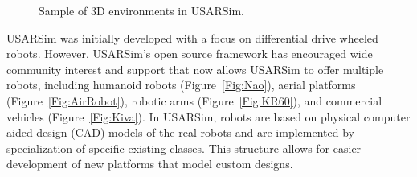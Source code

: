 \begin{figure}[t!]
\centering
{}\qquad
{}\qquad
{}\qquad%
\caption{Sample of 3D environments in USARSim.} \label{3D_World}
\end{figure}

USARSim was initially developed with a focus on differential drive wheeled robots. However, USARSim's open source framework has encouraged wide community interest and support that now allows USARSim to offer multiple robots, including humanoid robots (Figure~\ref{Fig:Nao}), aerial platforms (Figure~\ref{Fig:AirRobot}), robotic arms (Figure~\ref{Fig:KR60}), and commercial vehicles (Figure~\ref{Fig:Kiva}). In USARSim, robots are based on physical computer aided design (CAD) models of the real
robots and are implemented by specialization of specific existing classes. This structure allows for easier development of new platforms that model custom designs.

